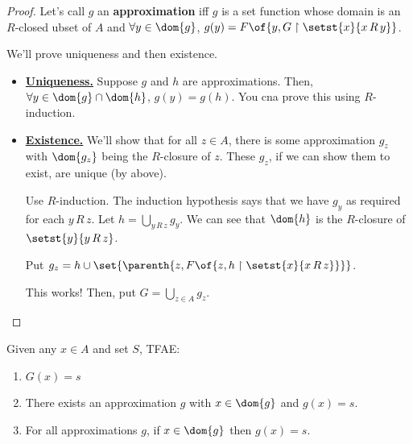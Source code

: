 \begin{proof} %
    Let's call $g$ an \textbf{approximation} iff $g$ is a set function whose domain is an $R$-closed ubset of $A$ and $\forall y \in \dom{g}$, $g(y) = F\of{y, G \restriction \setst{x}{x \, R \, y}}$. %

    We'll prove uniqueness and then existence.

    \begin{itemize}
        \item \underline{\textbf{Uniqueness.}}
            Suppose $g$ and $h$ are approximations. Then, $\forall y \in \dom{g} \cap \dom{h}$, $g(y) = g(h)$. You cna prove this using $R$-induction.

        \item \underline{\textbf{Existence.}}
            We'll show that for all $z \in A$, there is some approximation $g_z$ with $\dom{g_z}$ being the $R$-closure of $z$. These $g_z$, if we can show them to exist, are unique (by above).

            Use $R$-induction. The induction hypothesis says that we have $g_y$ as required for each $y \, R \, z$. Let $h = \bigcup_{y \, R \, z} g_y$. We can see that $\dom{h}$ is the $R$-closure of $\setst{y}{y \, R \, z}$.

            Put $g_z = h \cup \set{\parenth{z, F\of{z, h \restriction \setst{x}{x \, R \, z}}}}$.

            This works! Then, put $G = \bigcup_{z \in A} g_z$.

    \end{itemize}
\end{proof}

\begin{boxlemma}
    Given any $x \in A$ and set $S$, TFAE:
    \begin{enumerate}
        \item $G(x) = s$
        \item There exists an approximation $g$ with $x \in \dom{g}$ and $g(x) = s$.
        \item For all approximations $g$, if $x \in \dom{g}$ then $g(x) = s$.
    \end{enumerate}
\end{boxlemma}

